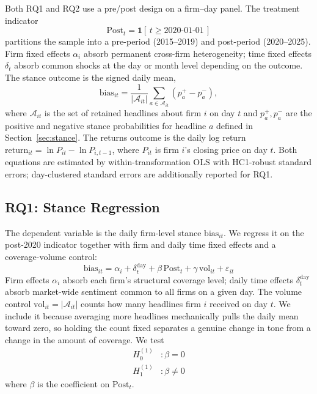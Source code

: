 \documentclass[conference]{IEEEtran}
\begin{document}
Both RQ1 and RQ2 use a pre/post design on a firm--day panel. The treatment indicator
\begin{equation}
\text{Post}_t = \mathbf{1}[\,t \ge \text{2020-01-01}\,]
\end{equation}
partitions the sample into a pre-period (2015--2019) and post-period (2020--2025).
Firm fixed effects $\alpha_i$ absorb permanent cross-firm heterogeneity; time fixed
effects $\delta_t$ absorb common shocks at the day or month level depending on the
outcome. The stance outcome is the signed daily mean,
\begin{equation}
\text{bias}_{it} = \frac{1}{|\mathcal{A}_{it}|}\sum_{a \in \mathcal{A}_{it}}(p_a^{+}-p_a^{-}),
\end{equation}
where $\mathcal{A}_{it}$ is the set of retained headlines about firm $i$ on day $t$ and
$p_a^{+},p_a^{-}$ are the positive and negative stance probabilities for headline $a$
defined in Section~\ref{sec:stance}. The returns outcome is the daily log return
$\text{return}_{it} = \ln P_{it} - \ln P_{i,t-1}$, where $P_{it}$ is firm $i$'s closing
price on day $t$.
Both equations are estimated by within-transformation OLS with HC1-robust standard
errors; day-clustered standard errors are additionally reported for RQ1.

\subsection{RQ1: Stance Regression}
The dependent variable is the daily firm-level stance $\text{bias}_{it}$. We regress it
on the post-2020 indicator together with firm and daily time fixed effects and a
coverage-volume control:
\begin{equation}
\text{bias}_{it} = \alpha_i + \delta_t^{\text{day}} + \beta\,\text{Post}_t + \gamma\,\text{vol}_{it} + \varepsilon_{it}
\label{eq:rq1}
\end{equation}
Firm effects $\alpha_i$ absorb each firm's structural coverage level; daily time
effects $\delta_t^{\text{day}}$ absorb market-wide sentiment common to all firms on
a given day. The volume control $\text{vol}_{it} = |\mathcal{A}_{it}|$ counts how many
headlines firm $i$ received on day $t$. We include it because averaging more headlines
mechanically pulls the daily mean toward zero, so holding the count fixed separates a
genuine change in tone from a change in the amount of coverage. We test
\begin{align*}
H_0^{(1)}&: \beta = 0 \\
H_1^{(1)}&: \beta \neq 0
\end{align*}
where $\beta$ is the coefficient on $\text{Post}_t$.
\end{document}
